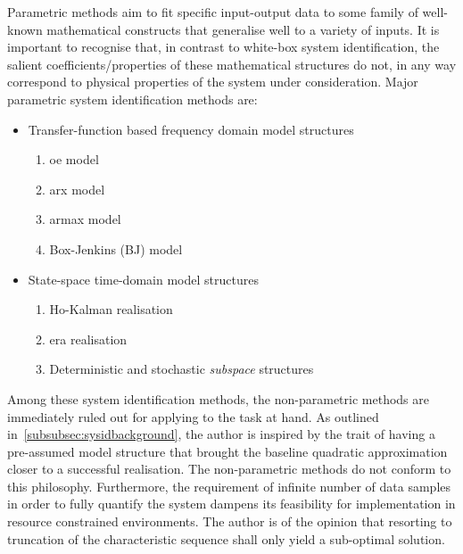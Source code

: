Parametric  methods  aim  to  fit  specific input-output  data  to  some  family
of  well-known  mathematical  constructs  that  generalise  well  to  a  variety
of  inputs.  It  is  important  to recognise  that,  in  contrast  to  white-box
system identification, the salient coefficients/properties of these mathematical
structures do  not, in any way  correspond to physical properties  of the system
under consideration. Major parametric system identification methods are:
\begin{itemize}
    \item Transfer-function based frequency domain model structures
        \begin{enumerate}
            \item \gls{oe} model
            \item \gls{arx} model
            \item \gls{armax} model
            \item Box-Jenkins (BJ) model
        \end{enumerate}
    \item State-space time-domain model structures
        \begin{enumerate}
            \item Ho-Kalman realisation
            \item \gls{era} realisation
            \item Deterministic and stochastic \emph{subspace} structures
        \end{enumerate}
\end{itemize}

Among  these  system  identification  methods, the  non-parametric  methods  are
immediately  ruled  out   for  applying  to  the  task  at   hand.  As  outlined
in~\cref{subsubsec:sysidbackground},  the author  is  inspired by  the trait  of
having  a  pre-assumed  model  structure that  brought  the  baseline  quadratic
approximation closer to a successful  realisation. The non-parametric methods do
not conform to this philosophy.  Furthermore, the requirement of infinite number
of data  samples in order to  fully quantify the system  dampens its feasibility
for implementation  in resource constrained  environments. The author is  of the
opinion that resorting  to truncation of the characteristic  sequence shall only
yield a sub-optimal solution.

